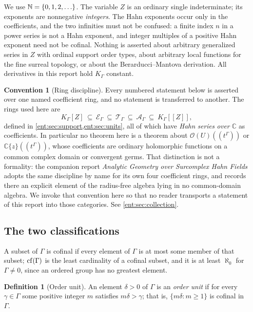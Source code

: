 \documentclass[11pt]{article}
\theoremstyle{plain}
\theoremstyle{plain}
\theoremstyle{plain}
\theoremstyle{definition}
\newtheorem{definition}[definition]{Definition}
\theoremstyle{definition}
\newtheorem{convention}[convention]{Convention}
\theoremstyle{definition}
\theoremstyle{definition}
\theoremstyle{remark}
\newcommand{\C}{\mathbb C}\newcommand{\R}{\mathbb R}
\newcommand{\K}{K_\Gamma}\newcommand{\KD}{K_\Delta}
\newcommand{\E}{\mathcal E_\Gamma}
\newcommand{\A}{\mathcal A_\Gamma}\newcommand{\OO}{\mathcal O_\Gamma}
\newcommand{\TT}{\mathcal T_\Gamma}
\begin{document}
We use $\mathbb N=\{0,1,2,\ldots\}$. The variable $Z$ is an ordinary single
indeterminate; its exponents are nonnegative \emph{integers}. The Hahn
exponents occur only in the coefficients, and the two infinities must not be
confused: a finite index $n$ in a power series is not a Hahn exponent, and
integer multiples of a positive Hahn exponent need not be cofinal. Nothing
is asserted about arbitrary generalized series in $Z$ with ordinal support
order types, about arbitrary local functions for the fine surreal topology,
or about the Berarducci--Mantova derivation. All derivatives in this report
hold $\K$ constant.

\begin{convention}[Ring discipline]\label{ent:conv:ring}
Every numbered statement below is asserted over one named coefficient ring,
and no statement is transferred to another. The rings used here are
\[
 \K[Z]\ \subseteq\ \E\ \subseteq\ \TT\ \subseteq\ \A\ \subseteq\ \K[[Z]],
\]
defined in \cref{ent:sec:support,ent:sec:units}, all of which have
\emph{Hahn series over $\C$} as coefficients. In particular no theorem here
is a theorem about $\mathcal O(U)((t^\Gamma))$ or $\C\{z\}((t^\Gamma))$,
whose coefficients are ordinary holomorphic functions on a common complex
domain or convergent germs. That distinction is not a formality: the
companion report \emph{Analytic Geometry over Surcomplex Hahn Fields}
adopts the same discipline by name for its own four coefficient rings, and
records there an explicit element of the radius-free algebra lying in no
common-domain algebra. We invoke that convention here so that no reader
transports a statement of this report into those categories. See
\cref{ent:sec:collection}.
\end{convention}

\subsection{The two classifications}
A subset of $\Gamma$ is cofinal if every element of $\Gamma$ is at most some
member of that subset; $\operatorname{cf}(\Gamma)$ is the least cardinality of a cofinal
subset, and it is at least $\aleph_0$ for $\Gamma\ne0$, since an ordered
group has no greatest element.

\begin{definition}[Order unit]\label{ent:def:order-unit}
An element $\delta>0$ of $\Gamma$ is an \emph{order unit} if for every
$\gamma\in\Gamma$ some positive integer $m$ satisfies $m\delta>\gamma$; that
is, $\{m\delta:m\ge1\}$ is cofinal in $\Gamma$.
\end{definition}
\end{document}
